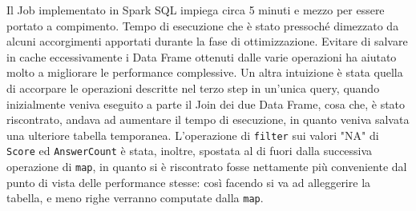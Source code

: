   Il Job implementato in Spark SQL impiega circa 5 minuti e mezzo per essere portato a compimento.
  Tempo di esecuzione che è stato pressoché dimezzato da alcuni accorgimenti apportati durante la fase di ottimizzazione.
  Evitare di salvare in cache eccessivamente i Data Frame ottenuti dalle varie operazioni ha aiutato molto a migliorare
  le performance complessive.
  Un altra intuizione è stata quella di accorpare le operazioni descritte nel terzo step in un'unica query, quando inizialmente
  veniva eseguito a parte il Join dei due Data Frame, cosa che, è stato riscontrato, andava ad aumentare il tempo di esecuzione,
  in quanto veniva salvata una ulteriore tabella temporanea.
  L'operazione di \texttt{filter} sui valori "NA" di \texttt{Score} ed \texttt{AnswerCount} è stata, inoltre, spostata al di fuori
  dalla successiva operazione di \texttt{map}, in quanto si è riscontrato fosse nettamente più conveniente dal punto di vista
  delle performance stesse: così facendo si va ad alleggerire la tabella, e meno righe verranno computate dalla \texttt{map}.

